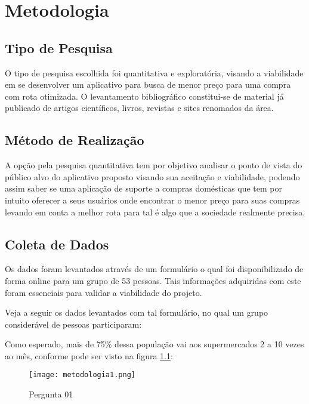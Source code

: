 \chapter{Metodologia} 

\section{Tipo de Pesquisa}
O tipo de pesquisa escolhida foi quantitativa e exploratória, visando a viabilidade em se  desenvolver um aplicativo para busca de menor preço para uma compra com rota otimizada. O levantamento bibliográfico constitui-se de material já publicado de artigos científicos, livros, revistas e sites renomados da área.

\section{Método de Realização}
A opção pela pesquisa quantitativa tem por objetivo analisar o ponto de vista do público alvo do aplicativo proposto visando sua aceitação e viabilidade, podendo assim saber se uma aplicação de suporte a compras domésticas que tem por intuito oferecer a seus usuários onde encontrar o menor preço para suas compras levando em conta a melhor rota para tal é algo que a sociedade realmente precisa.

\section{Coleta de Dados}
Os dados foram levantados através de um formulário o qual foi disponibilizado de forma online para um grupo de 53 pessoas. Tais informações adquiridas com este foram essenciais para validar a viabilidade do projeto. 

Veja a seguir os dados levantados com tal formulário, no qual um grupo considerável de pessoas participaram:

Como esperado, mais de 75\% dessa população vai aos supermercados 2 a 10 vezes ao mês, conforme pode ser visto na figura \ref{fig:metodologia1}:

\begin{figure}[H]
    \centering
        \caption{Pergunta 01}
        \texttt{[image: metodologia1.png]}
        \label{fig:metodologia1}
\end{figure}


